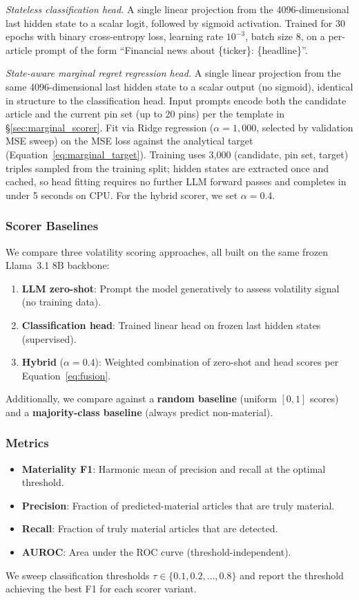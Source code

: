 \documentclass{article}
\begin{document}
\emph{Stateless classification head.}
A single linear projection from the 4096-dimensional last hidden state to a scalar logit, followed by sigmoid activation.
Trained for 30 epochs with binary cross-entropy loss, learning rate $10^{-3}$, batch size 8, on a per-article prompt of the form ``Financial news about \{ticker\}: \{headline\}''.

\emph{State-aware marginal regret regression head.}
A single linear projection from the same 4096-dimensional last hidden state to a scalar output (no sigmoid), identical in structure to the classification head.
Input prompts encode both the candidate article and the current pin set (up to 20 pins) per the template in \S\ref{sec:marginal_scorer}.
Fit via Ridge regression ($\alpha = 1{,}000$, selected by validation MSE sweep) on the MSE loss against the analytical target (Equation~\eqref{eq:marginal_target}).
Training uses 3{,}000 (candidate, pin set, target) triples sampled from the training split; hidden states are extracted once and cached, so head fitting requires no further LLM forward passes and completes in under 5 seconds on CPU.
For the hybrid scorer, we set $\alpha = 0.4$.

\subsubsection{Scorer Baselines}

We compare three volatility scoring approaches, all built on the same frozen Llama~3.1 8B backbone:
\begin{enumerate}
  \item \textbf{LLM zero-shot}: Prompt the model generatively to assess volatility signal (no training data).
  \item \textbf{Classification head}: Trained linear head on frozen last hidden states (supervised).
  \item \textbf{Hybrid} ($\alpha = 0.4$): Weighted combination of zero-shot and head scores per Equation~\eqref{eq:fusion}.
\end{enumerate}
Additionally, we compare against a \textbf{random baseline} (uniform $[0,1]$ scores) and a \textbf{majority-class baseline} (always predict non-material).

\subsubsection{Metrics}

\begin{itemize}
  \item \textbf{Materiality F1}: Harmonic mean of precision and recall at the optimal threshold.
  \item \textbf{Precision}: Fraction of predicted-material articles that are truly material.
  \item \textbf{Recall}: Fraction of truly material articles that are detected.
  \item \textbf{AUROC}: Area under the ROC curve (threshold-independent).
\end{itemize}
We sweep classification thresholds $\tau \in \{0.1, 0.2, \ldots, 0.8\}$ and report the threshold achieving the best F1 for each scorer variant.
\end{document}
